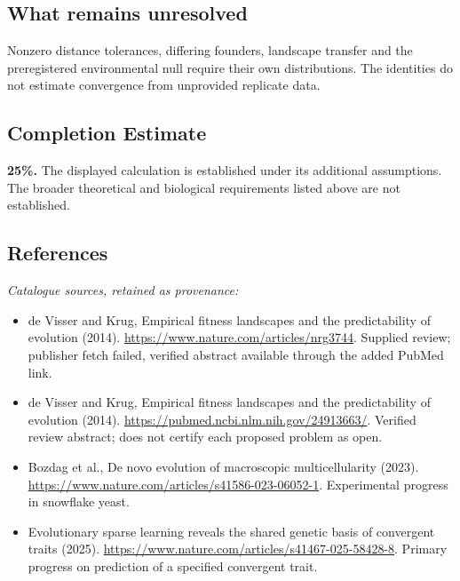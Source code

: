 \documentclass[11pt]{article}
\begin{document}
\subsection{What remains unresolved}
Nonzero distance tolerances, differing founders, landscape transfer and the preregistered environmental null require their own distributions. The identities do not estimate convergence from unprovided replicate data.
\subsection{Completion Estimate}
\textbf{25\%.} The displayed calculation is established under its additional assumptions. The broader theoretical and biological requirements listed above are not established.
\subsection{References}
\noindent\emph{Catalogue sources, retained as provenance:}
\begin{itemize}
\item de Visser and Krug, Empirical fitness landscapes and the predictability of evolution (2014). \url{https://www.nature.com/articles/nrg3744}. Supplied review; publisher fetch failed, verified abstract available through the added PubMed link.
\item de Visser and Krug, Empirical fitness landscapes and the predictability of evolution (2014). \url{https://pubmed.ncbi.nlm.nih.gov/24913663/}. Verified review abstract; does not certify each proposed problem as open.
\item Bozdag et al., De novo evolution of macroscopic multicellularity (2023). \url{https://www.nature.com/articles/s41586-023-06052-1}. Experimental progress in snowflake yeast.
\item Evolutionary sparse learning reveals the shared genetic basis of convergent traits (2025). \url{https://www.nature.com/articles/s41467-025-58428-8}. Primary progress on prediction of a specified convergent trait.
\end{itemize}
\end{document}
